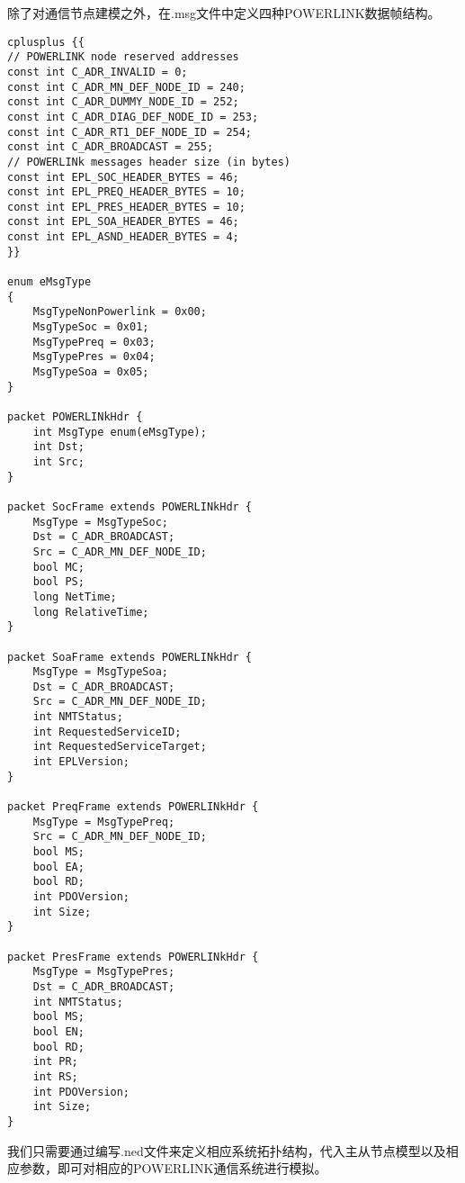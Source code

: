 除了对通信节点建模之外，在.msg文件中定义四种POWERLINK数据帧结构。
\begin{lstlisting}
cplusplus {{
// POWERLINK node reserved addresses
const int C_ADR_INVALID = 0;
const int C_ADR_MN_DEF_NODE_ID = 240;
const int C_ADR_DUMMY_NODE_ID = 252;
const int C_ADR_DIAG_DEF_NODE_ID = 253;
const int C_ADR_RT1_DEF_NODE_ID = 254;
const int C_ADR_BROADCAST = 255;
// POWERLINk messages header size (in bytes)
const int EPL_SOC_HEADER_BYTES = 46;
const int EPL_PREQ_HEADER_BYTES = 10;
const int EPL_PRES_HEADER_BYTES = 10;
const int EPL_SOA_HEADER_BYTES = 46;
const int EPL_ASND_HEADER_BYTES = 4;
}}

enum eMsgType
{
    MsgTypeNonPowerlink = 0x00;
    MsgTypeSoc = 0x01;
    MsgTypePreq = 0x03;
    MsgTypePres = 0x04;
    MsgTypeSoa = 0x05;
}

packet POWERLINkHdr {
    int MsgType enum(eMsgType);
    int Dst;
    int Src;
}

packet SocFrame extends POWERLINkHdr {
    MsgType = MsgTypeSoc;
    Dst = C_ADR_BROADCAST;
    Src = C_ADR_MN_DEF_NODE_ID;
    bool MC;
    bool PS;
    long NetTime;
    long RelativeTime;
}

packet SoaFrame extends POWERLINkHdr {
    MsgType = MsgTypeSoa;
    Dst = C_ADR_BROADCAST;
    Src = C_ADR_MN_DEF_NODE_ID;
    int NMTStatus;
    int RequestedServiceID;
    int RequestedServiceTarget;
    int EPLVersion;
}

packet PreqFrame extends POWERLINkHdr {
    MsgType = MsgTypePreq;
    Src = C_ADR_MN_DEF_NODE_ID;
    bool MS;
    bool EA;
    bool RD;
    int PDOVersion;
    int Size;
}

packet PresFrame extends POWERLINkHdr {
    MsgType = MsgTypePres;
    Dst = C_ADR_BROADCAST;
    int NMTStatus;
    bool MS;
    bool EN;
    bool RD;
    int PR;
    int RS;
    int PDOVersion;
    int Size;
}
\end{lstlisting}

我们只需要通过编写.ned文件来定义相应系统拓扑结构，代入主从节点模型以及相应参数，即可对相应的POWERLINK通信系统进行模拟。
